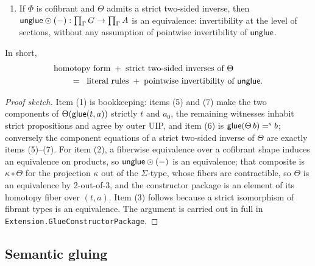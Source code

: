 \begin{lemma}
\begin{enumerate}
		of the homotopy fiber of the equivalence $\Theta$ over $(t,a)$.
		\item If $\Phi$ is cofibrant and $\Theta$ admits a strict two-sided
		inverse, then $\mathsf{unglue}\odot(-):\prod_\Gamma G\to\prod_\Gamma A$ is an
		equivalence: invertibility at the level of sections, without any
		assumption of pointwise invertibility of $\mathsf{unglue}$.
	\end{enumerate}
	In short,
	\[
		\begin{aligned}
			&\text{homotopy form} \;+\; \text{strict two-sided inverses of }\Theta\\
			&\qquad=\;\; \text{literal rules} \;+\; \text{pointwise invertibility of }\mathsf{unglue}.
		\end{aligned}
	\]
\end{lemma}
\begin{proof}[Proof sketch]
	Item (1) is bookkeeping: items (5) and (7) make the two components of
	$\Theta(\mathsf{glue}(t,a))$ strictly $t$ and $a_0$, the remaining witnesses inhabit
	strict propositions and agree by outer UIP, and item (6) is
	$\mathsf{glue}(\Theta\,b)\mathrel{=^\textup{s}} b$; conversely the component equations of a strict
	two-sided inverse of $\Theta$ are exactly items (5)--(7). For item (2), a
	fiberwise equivalence over a cofibrant shape induces an equivalence on
	products, so $\mathsf{unglue}\odot(-)$ is an equivalence; that composite is
	$\kappa\circ\Theta$ for the projection $\kappa$ out of the $\Sigma$-type,
	whose fibers are contractible, so $\Theta$ is an equivalence by
	2-out-of-3, and the constructor package is an element of its homotopy fiber
	over $(t,a)$. Item (3) follows because a strict isomorphism of fibrant types
	is an equivalence. The argument is carried out in full in
	\texttt{Extension.GlueConstructorPackage}.
\end{proof}



\subsection{Semantic gluing}



